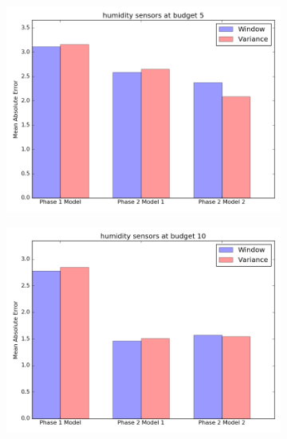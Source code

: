 \documentclass{article}
\begin{document}
\begin{figure}[h!]
	\begin{subfigure}{\linewidth}
	\includegraphics[scale=0.5]{humidity_5.png}
	\end{subfigure}
	\begin{subfigure}{\linewidth}
	\includegraphics[scale=0.5]{humidity_10.png}
	\end{subfigure}
\end{figure}

\newpage
\end{document}
